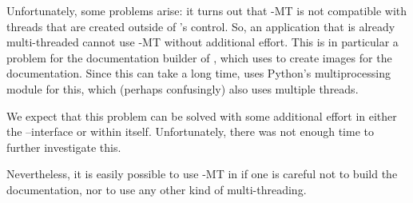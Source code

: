 \documentclass{deliverablereport}
\begin{document}
Unfortunately, some problems arise:
it turns out that \Pari-MT is not compatible with
threads that are created outside of \Pari's control.
So, an application that is already multi-threaded cannot use \Pari-MT without additional effort.
This is in particular a problem for the documentation builder of \Sage,
which uses \Pari to create images for the documentation.
Since this can take a long time, \Sage uses Python's
multiprocessing module for this,
which (perhaps confusingly) also uses multiple threads.

We expect that this problem can be solved with some additional effort
in either the \Sage--\Pari interface or within \Pari itself.
Unfortunately, there was not enough time to further investigate this.

Nevertheless, it is easily possible to use \Pari-MT in \Sage
if one is careful not to build the documentation,
nor to use any other kind of multi-threading.




\end{document}
